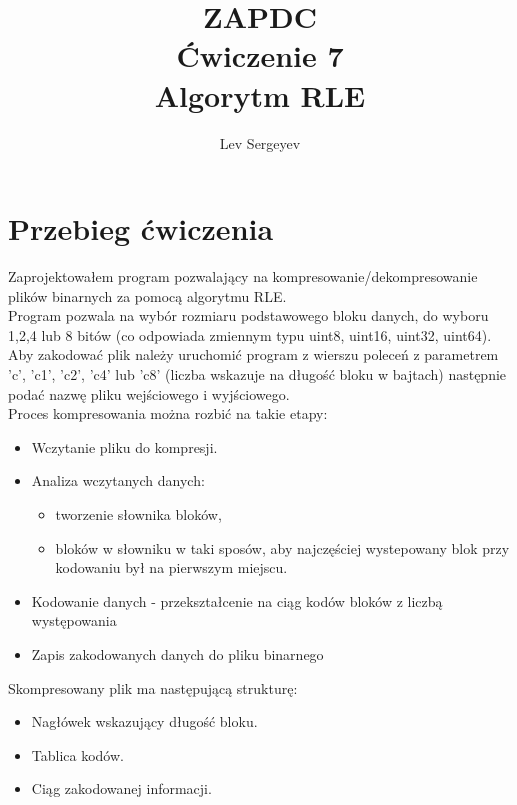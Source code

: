 \documentclass{article}
\author{Lev Sergeyev}
\title{ZAPDC \\ Ćwiczenie 7 \\ Algorytm RLE}
\date{ }
\begin{document}
\maketitle


\section{Przebieg ćwiczenia}
Zaprojektowałem program pozwalający na kompresowanie/dekompresowanie plików binarnych za pomocą algorytmu RLE. \\
Program pozwala na wybór rozmiaru podstawowego bloku danych, do wyboru 1,2,4 lub 8 bitów (co odpowiada zmiennym typu uint8, uint16, uint32, uint64). \\
Aby zakodować plik należy uruchomić program z wierszu poleceń z parametrem 'c', 'c1', 'c2', 'c4' lub 'c8' (liczba wskazuje na długość bloku w bajtach) następnie podać nazwę pliku wejściowego i wyjściowego. \\ Proces kompresowania można rozbić na takie etapy:
\begin{itemize} 
	\item Wczytanie pliku do kompresji.
	\item Analiza wczytanych danych:
	\begin{itemize} 
		\item tworzenie słownika bloków,
		\item bloków w słowniku w taki sposów, aby najczęściej wystepowany blok przy kodowaniu był na pierwszym miejscu.
	\end{itemize}
	\item Kodowanie danych - przekształcenie na ciąg kodów bloków z liczbą występowania
	\item Zapis zakodowanych danych do pliku binarnego
\end{itemize}
\par
Skompresowany plik ma następującą strukturę:
\begin{itemize} 
	\item Nagłówek wskazujący długość bloku.
	\item Tablica kodów.
	\item Ciąg zakodowanej informacji.
\end{itemize}
\end{document}
